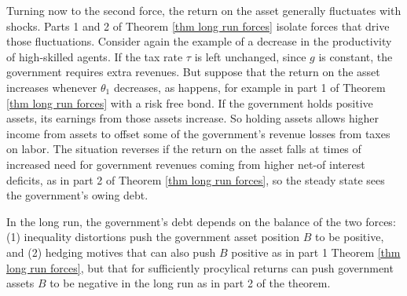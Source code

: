 \documentclass[thmsb,11pt]{article}
\begin{document}



 Turning now to the second force, the return on the asset  generally fluctuates
 with  shocks.  Parts 1 and 2 of  Theorem \ref{thm long run forces} isolate forces that  drive those  fluctuations.
 Consider again the example of a
 decrease in the productivity of high-skilled agents. If the  tax rate  $\tau $ is left unchanged,
 since $g$ is constant, the
 government requires  extra revenues. But  suppose that
 the return on the asset increases whenever $\theta_1 $ decreases, as happens, for
 example in part 1 of Theorem \ref{thm long run forces} with a risk free bond. If the government holds positive assets, its earnings from those assets increase.
 So holding assets allows higher income from assets  to offset some of the government's revenue losses from taxes on labor.
 The situation reverses if the return on the asset falls at
 times of increased need for government revenues coming from higher net-of interest deficits, as in
  part 2 of  Theorem \ref{thm long run forces}, so the steady state sees the government's owing debt.

In the  long run, the government's  debt depends on the balance of the two forces: (1) inequality
distortions  push the government asset position $B$ to be positive,  and (2)  hedging motives that can also push $B$ positive  as in part 1  Theorem \ref{thm long run forces},
 but that for sufficiently procylical returns can
push   government assets $B$ to be negative in the long run as in part 2 of the theorem.
\color{black}
\end{document}
